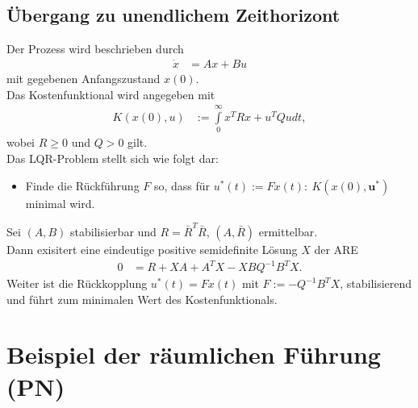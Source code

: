 \subsection{Übergang zu unendlichem Zeithorizont}
Der Prozess wird beschrieben durch
\begin{align}
	\dot{x} & = A x + B u
\end{align}
mit gegebenen Anfangszustand $x(0)$.\\
Das Kostenfunktional wird angegeben mit
\begin{align}
	K\left(x(0), u \right) & := \int\limits_0^{\infty}x^TRx + u^TQu dt,
\end{align}
wobei $R\geq 0$ und $Q>0$ gilt.\\
Das \ac{LQR}-Problem stellt sich wie folgt dar:
\begin{itemize}
  \item[] Finde die Rückführung $F$ so, dass für $u^{\ast}(t):=Fx(t):\ K\left(x(0),\bm{u}^{\ast} \right)$ minimal wird. 
\end{itemize}
\begin{satz}
Sei $(A,B)$ stabilisierbar und $R=\bar{R}^T\bar{R}$, $(A,\bar{R})$ ermittelbar.\\
Dann exisitert eine eindeutige positive semidefinite Lösung $X$ der \ac{ARE} 
\begin{align*}
	0 & = R+XA+A^TX-XBQ^{-1}B^TX.
\end{align*} 
Weiter ist die Rückkopplung $u^{\ast}(t)=Fx(t)$ mit $F:=-Q^{-1}B^TX$,
stabilisierend und führt zum minimalen Wert des Kostenfunktionals.
\end{satz}

\section{Beispiel der räumlichen Führung (\ac{PN})}
